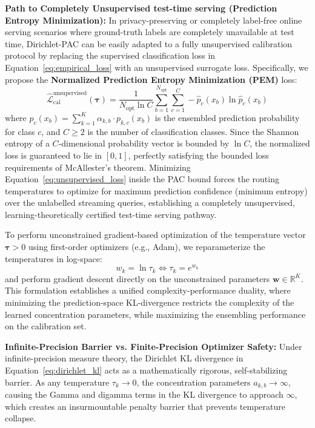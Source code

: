 \textbf{Path to Completely Unsupervised test-time serving (Prediction Entropy Minimization):}
In privacy-preserving or completely label-free online serving scenarios where ground-truth labels are completely unavailable at test time, Dirichlet-PAC can be easily adapted to a fully unsupervised calibration protocol by replacing the supervised classification loss in Equation~\eqref{eq:empirical_loss} with an unsupervised surrogate loss. Specifically, we propose the \textbf{Normalized Prediction Entropy Minimization (PEM)} loss:
\begin{equation}
  \widehat{\mathcal{L}}_{\text{cal}}^{\text{unsupervised}}(\boldsymbol{\tau}) = \frac{1}{N_{\text{opt}} \ln C} \sum_{b=1}^{N_{\text{opt}}} \sum_{c=1}^C - \hat{p}_c(x_b) \ln \hat{p}_c(x_b)
  \label{eq:unsupervised_loss}
\end{equation}
where $\hat{p}_c(x_b) = \sum_{k=1}^K \alpha_{k, b} \cdot p_{k, c}(x_b)$ is the ensembled prediction probability for class $c$, and $C \ge 2$ is the number of classification classes. Since the Shannon entropy of a $C$-dimensional probability vector is bounded by $\ln C$, the normalized loss is guaranteed to lie in $[0, 1]$, perfectly satisfying the bounded loss requirements of McAllester's theorem. Minimizing Equation~\eqref{eq:unsupervised_loss} inside the PAC bound forces the routing temperatures to optimize for maximum prediction confidence (minimum entropy) over the unlabelled streaming queries, establishing a completely unsupervised, learning-theoretically certified test-time serving pathway.

To perform unconstrained gradient-based optimization of the temperature vector $\boldsymbol{\tau} > 0$ using first-order optimizers (e.g., Adam), we reparameterize the temperatures in log-space:
\begin{equation}
  w_k = \ln \tau_k \iff \tau_k = e^{w_k}
  \label{eq:reparameterization}
\end{equation}
and perform gradient descent directly on the unconstrained parameters $\mathbf{w} \in \mathbb{R}^K$. This formulation establishes a unified complexity-performance duality, where minimizing the prediction-space KL-divergence restricts the complexity of the learned concentration parameters, while maximizing the ensembling performance on the calibration set. 

\textbf{Infinite-Precision Barrier vs. Finite-Precision Optimizer Safety:}
Under infinite-precision measure theory, the Dirichlet KL divergence in Equation~\eqref{eq:dirichlet_kl} acts as a mathematically rigorous, self-stabilizing barrier. As any temperature $\tau_k \to 0$, the concentration parameters $a_{k, b} \to \infty$, causing the Gamma and digamma terms in the KL divergence to approach $\infty$, which creates an insurmountable penalty barrier that prevents temperature collapse. 

